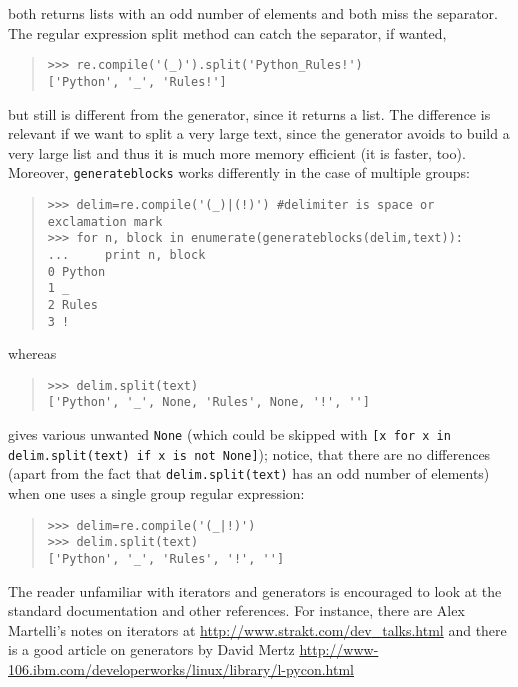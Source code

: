 \documentclass[10pt,english]{article}
\begin{document}
both returns lists with an odd number of elements and both miss the separator. 
The regular expression split method can catch the separator, if wanted,
\begin{quote}
\begin{verbatim}>>> re.compile('(_)').split('Python_Rules!')
['Python', '_', 'Rules!']\end{verbatim}
\end{quote}

but still is different from the generator, since it returns a list. The
difference is relevant if we want to split a very large text, since 
the generator avoids to build a very large list and thus it is much more
memory efficient (it is faster, too). Moreover, \texttt{generateblocks}
works differently in the case of multiple groups:
\begin{quote}
\begin{verbatim}>>> delim=re.compile('(_)|(!)') #delimiter is space or exclamation mark
>>> for n, block in enumerate(generateblocks(delim,text)): 
...     print n, block
0 Python
1 _
2 Rules
3 !\end{verbatim}
\end{quote}

whereas
\begin{quote}
\begin{verbatim}>>> delim.split(text)
['Python', '_', None, 'Rules', None, '!', '']\end{verbatim}
\end{quote}

gives various unwanted \texttt{None} (which could be skipped with 
\texttt{[x for x in delim.split(text) if x is not None]}); notice, that
there are no differences (apart from the fact that \texttt{delim.split(text)}
has an odd number of elements) when one uses a single group regular expression:
\begin{quote}
\begin{verbatim}>>> delim=re.compile('(_|!)')
>>> delim.split(text)
['Python', '_', 'Rules', '!', '']\end{verbatim}
\end{quote}

The reader unfamiliar with iterators and generators is encouraged
to look at the standard documentation and other 
references. For instance, there are Alex Martelli's notes on iterators at 
\href{http://www.strakt.com/dev_talks.html}{http://www.strakt.com/dev{\_}talks.html}
and there is a good article on generators by David Mertz
\href{http://www-106.ibm.com/developerworks/linux/library/l-pycon.html}{http://www-106.ibm.com/developerworks/linux/library/l-pycon.html}
\end{document}
